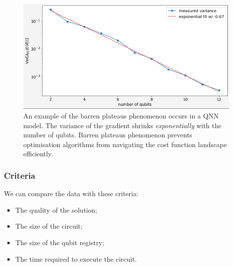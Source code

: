 \begin{figure}
    \includegraphics[width=\textwidth]{./ResearchDesign/Appendices/VarianceShrinking.png}
    \caption{
        An example of the barren plateaus phenomenon occurs in a QNN model.
        The variance of the gradient shrinks \textit{exponentially} with the number of qubits.
        Barren plateaus phenomenon prevents optimisation algorithms from navigating the cost function landscape efficiently.
    }
    \label{Variance Shrinking demo}
\end{figure}


\subsubsection{Criteria}
\label{Criteria section}
We can compare the data with these criteria:
\begin{itemize}
    \item The quality of the solution;
    \item The size of the circuit;
    \item The size of the qubit registry;
    \item The time required to execute the circuit.
\end{itemize}

